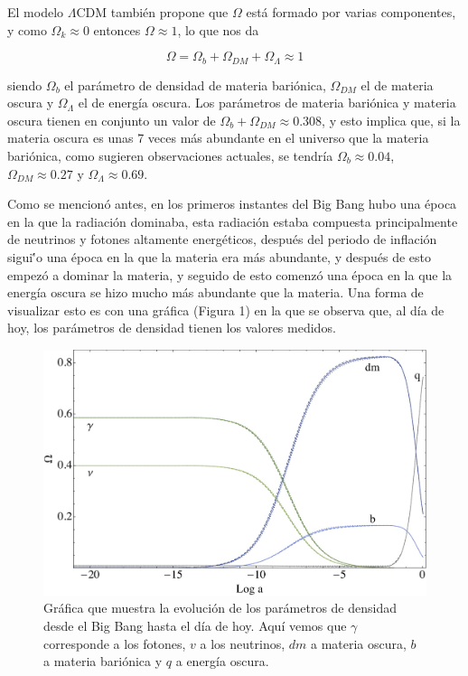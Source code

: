 \documentclass{article}
\begin{document}
El modelo $\Lambda$CDM tambi\'en propone que $\Omega$ est\'a formado por varias componentes, y como $\Omega_k \approx 0$ entonces $\Omega \approx 1$, lo que nos da

\begin{equation}
\Omega=\Omega_b + \Omega_{DM} + \Omega_\Lambda \approx 1
\end{equation}

siendo $\Omega_b$ el par\'ametro de densidad de materia bari\'onica, $\Omega_{DM}$ el de materia oscura y $\Omega_\Lambda$ el de energ\'ia oscura. Los par\'ametros de materia bari\'onica y materia oscura tienen en conjunto un valor de $\Omega_b + \Omega_{DM} \approx 0.308$, y esto implica que, si la materia oscura es unas 7 veces m\'as abundante en el universo que la materia bari\'onica, como sugieren observaciones actuales, se tendr\'ia $\Omega_b \approx 0.04$, $\Omega_{DM} \approx 0.27$ y $\Omega_\Lambda \approx 0.69$.

Como se mencion\'o antes, en los primeros instantes del Big Bang hubo una \'epoca en la que la radiaci\'on dominaba, esta radiaci\'on estaba compuesta principalmente de neutrinos y fotones altamente energ\'eticos, despu\'es del periodo de inflaci\'on sigui\''o una \'epoca en la que la materia era m\'as abundante, y despu\'es de esto empez\'o a dominar la materia, y seguido de esto comenz\'o una \'epoca en la que la energ\'ia oscura se hizo mucho m\'as abundante que la materia. Una forma de visualizar esto es con una gr\'afica (Figura 1) en la que se observa que, al d\'ia de hoy, los par\'ametros de densidad tienen los valores medidos.


\begin{figure}
\includegraphics[scale=0.26]{grafica}
\caption{Gr\'afica que muestra la evoluci\'on de los par\'ametros de densidad desde el Big Bang hasta el d\'ia  de hoy. Aqu\'i vemos que  $\gamma$ corresponde a los fotones, $v$ a los neutrinos, $dm$ a materia oscura, $b$ a materia bari\'onica y $q$ a energ\'ia oscura.} 
\end{figure}
\end{document}
